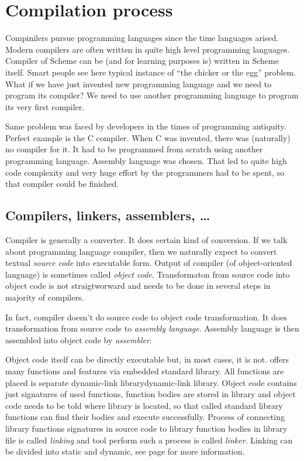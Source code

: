 \section{Compilation process}\label{section:compilation}
Compinilers pursue programming languages since the time languages arised. Modern compilers are often written in quite high level programming languages. Compiler of Scheme can be (and for learning purposes is) written in Scheme itself. Smart people see here typical instance of \enquote{the chicker or the egg} problem. What if we have just invented new programming language and we need to program its compiler? We need to use another programming language to program its very first compiler.

Same problem was faced by developers in the times of programming antiquity. Perfect example is the C compiler. When C was invented, there was (naturally) no compiler for it. It had to be programmed from scratch using another programming language. Assembly language was chosen. That led to quite high code complexity and very huge effort by the programmers had to be spent, so that compiler could be finished.

\subsection{Compilers, linkers, assemblers, \ldots}
Compiler is generally a converter. It does certain kind of conversion. If we talk about programming language compiler, then we naturally expect to convert textual \textit{source code} into executable form. Output of compiler (of object-oriented language) is sometimes called \textit{object code}. Transformaton from source code into object code is not straigtworward and needs to be done in several steps in majority of \cpp compilers.

In fact, compiler doesn't do source code to object code transformation. It does transformation from source code to \textit{assembly language}. Assembly language is then assembled into object code by \textit{assembler}.

Object code itself can be directly executable but, in most cases, it is not. \cpp offers many functions and features via embedded standard library. All functions are placed is separate dynamic-link library{dynamic-link library}. Object code contains just signatures of used functions, function bodies are stored in library and object code needs to be told where library is located, so that called standard library functions can find their bodies and execute successfully. Process of connecting library functions signatures in source code to library function bodies in library file is called \textit{linking} and tool perform such a process is called \textit{linker}. Linking can be divided into static and dynamic, see page \pageref{listing:linking} for more information.

